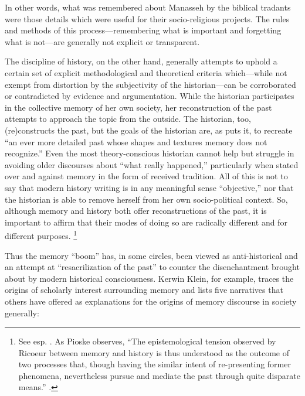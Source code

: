 In other words, what was remembered about Manasseh by the biblical tradants were those details which were useful for their socio-religious projects. The rules and methods of this process---remembering what is important and forgetting what is not---are generally not explicit or transparent.  

The discipline of history, on the other hand, generally attempts to uphold a certain set of explicit methodological and theoretical criteria which---while not exempt from distortion by the subjectivity of the historian---can be corroborated or contradicted by evidence and argumentation.\autocite[12--13]{pioske_bibint2015} While the historian participates in the collective memory of her own society, her reconstruction of the past attempts to approach the topic from the outside. The historian, too, (re)constructs the past, but the goals of the historian are, as \yerushalmi puts it, to recreate ``an ever more detailed past whose shapes and textures memory does not recognize.''\autocites[94]{yerushalmi1989}[See also][532]{verovsek_pgi2016} Even the most theory-conscious historian cannot help but struggle in avoiding older discourses about ``what really happened,'' particularly when stated over and against memory in the form of received tradition. All of this is not to say that modern history writing is in any meaningful sense ``objective,'' nor that the historian is able to remove herself from her own socio-political context. So, although memory and history both offer reconstructions of the past, it is important to affirm that their modes of doing so are radically different and for different purposes.%
%
\footnote{See esp. \cite[497]{ricoeur2004}. As Pioske observes, ``The epistemological tension observed by Ricoeur between memory and history is thus understood as the outcome of two processes that, though having the similar intent of re-presenting former phenomena, nevertheless pursue and mediate the past through quite disparate means.'' \cite[12]{pioske_bibint2015}.}

Thus the memory ``boom'' has, in some circles, been viewed as anti-historical and an attempt at ``resacrilization of the past'' to counter the disenchantment brought about by modern historical consciousness.\autocite[282]{winter2006} Kerwin Klein, for example, traces the origins of scholarly interest surrounding memory and lists five narratives that others have offered as explanations for the origins of memory discourse in society generally:  

